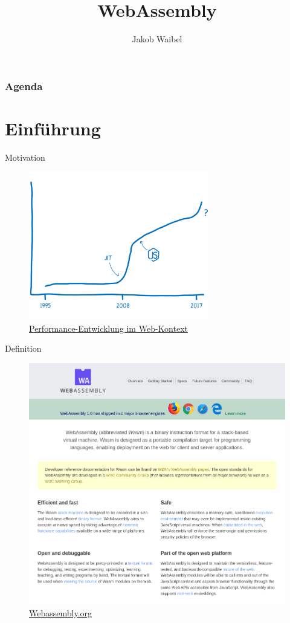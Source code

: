 \documentclass{beamer}
\title[WebAssembly]{WebAssembly}
\author{Jakob Waibel}
\institute[Jakob Waibel]{MI7 Druck und Medien}
\date
\begin{document}
\begin{frame}
    \titlepage
\end{frame}

\begin{frame}
    \frametitle{Agenda}
    \tableofcontents
\end{frame}

\section{Einführung}

\begin{frame}{Motivation}
    \begin{figure}
        \includegraphics[width=0.7\textwidth,height=0.7\textheight]{./images/perf_history.png}
        \caption{\href{https://hacks.mozilla.org/2017/02/a-cartoon-intro-to-webassembly/}{Performance-Entwicklung im Web-Kontext}}
    \end{figure}
\end{frame}

\begin{frame}{Definition}
    \begin{figure}
        \includegraphics[scale=0.2]{./images/webassembly_org.png}
        \caption{\href{https://webassembly.org/}{Webassembly.org}}
    \end{figure}
\end{frame}
\end{document}
